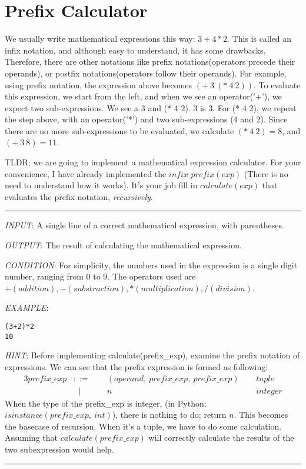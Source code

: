 \documentclass{article}
\begin{document}
\section{Prefix Calculator}
We usually write mathematical expressions this way:
$3+4*2$. This is called an infix notation, and although easy to understand, it has
some drawbacks.
Therefore, there are other notations like prefix notations(operators precede
their operands), or postfix notations(operators follow their operands).
For example, using prefix notation, the expression above becomes $(+\ 3\ (*\ 4\
2))$.
To evaluate this expression, we start from the left, and when we see an
operator('+'), we expect two sub-expressions. We see a 3 and (* 4 2).
3 is 3. For (* 4 2), we repeat the step above, with an operator('*') and
two sub-expressions (4 and 2). Since there are no more sub-expressions to be
evaluated, we calculate $(*\ 4\ 2) = 8$, and $(+\ 3\ 8) = 11$.

TLDR; we are going to implement a mathematical expression calculator.
For your convenience, I have already implemented the $infix\_prefix(exp)$
(There is no need to understand how it works).
It's your job fill in $calculate(exp)$ that evaluates the prefix notation,
\textit{recursively}.


\noindent\rule{\textwidth}{0.9pt}
\textit{INPUT}: A single line of a correct mathematical expression, with
parentheses.

\textit{OUTPUT}: The result of calculating the mathematical expression.

\textit{CONDITION}: For simplicity, the numbers used in the expression is a
single digit number, ranging from 0 to 9. The operators used are $+(addition),
-(substraction), *(multiplication), /(division)$.

\textit{EXAMPLE}:
\begin{lstlisting}
(3+2)*2
10
\end{lstlisting}

\textit{HINT}: Before implementing calculate(prefix\_exp), examine the prefix notation
of expressions. We can see that the prefix expression is formed as following:
\begin{alignat*}{3}
  prefix\_exp &::= \ \  &&(operand,\ prefix\_exp,\ prefix\_exp)\ \  &&tuple\\
      &\ \ \ | &&n &&integer
\end{alignat*}
When the type of the prefix\_exp is integer, (in Python:
$isinstance(prefix\_exp,\ int)$), there
is nothing to do; return $n$. This becomes the basecase
of recursion. When it's a tuple, we have to do some calculation. Assuming that
$calculate(prefix\_exp)$ will correctly calculate the results of the two subexpression would help.\\
\noindent\rule{\textwidth}{0.9pt}
\end{document}
